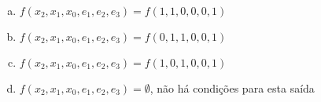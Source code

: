 {


  \begin{solution}
    \begin{enumerate}[a)]
    \item $f(x_2,x_1,x_0,e_1,e_2,e_3)=f(1,1,0,0,0,1)$
      \item $f(x_2,x_1,x_0,e_1,e_2,e_3)=f(0,1,1,0,0,1)$
      \item $f(x_2,x_1,x_0,e_1,e_2,e_3)=f(1,0,1,0,0,1)$
      \item $f(x_2,x_1,x_0,e_1,e_2,e_3)=\emptyset$, não há condições para esta saída
    \end{enumerate}
  \end{solution}
}

